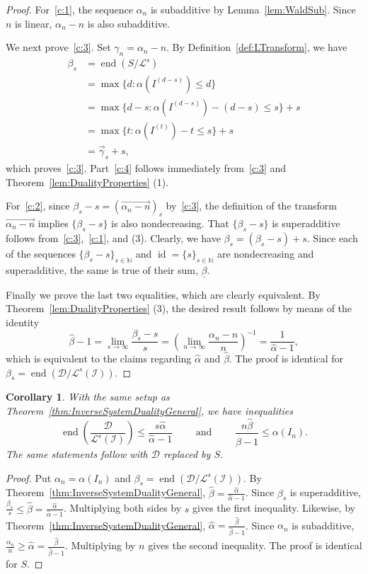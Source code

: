 \documentclass[12pt, reqno]{amsart}
\numberwithin{equation}{section}
\def\a{\ensuremath{\alpha}}
\def\b{\ensuremath{\beta}}
\def\ub{\ensuremath{\underline{\beta}}}
\newcommand{\wa}{\widehat{\alpha}}
\newcommand{\wb}{\widehat{\beta}}
\newcommand{\N}{{\mathbb N}}
\newcommand{\cL}{{\mathcal L}}
\newcommand{\I}{{\mathcal I}}
\renewcommand{\L}{{\mathcal L}}
\DeclareMathOperator{\soc}{end}
\def\id{{\operatorname{id}}}
\theoremstyle{plain} %
\newtheorem{cor}[thm]{Corollary}
\theoremstyle{definition}
\theoremstyle{remark}
\renewcommand{\L}{\mathcal{L}}
\begin{document}
\begin{proof}
For~\eqref{c:1}, the sequence $\alpha_n$ is subadditive by Lemma~\ref{lem:WaldSub}.  Since $n$ is linear, $\alpha_n-n$ is also subadditive.

We next prove~\eqref{c:3}.  Set $\gamma_n=\a_n-n$. By Definition~\ref{def:LTransform}, we have
\[
\begin{array}{rl}
\b_s & =\soc(S/\L^s)\\[5 pt]
&= \max\{d:\alpha(I^{(d-s)})\le d\}\\[5 pt]
&=\max\{d-s:\alpha(I^{(d-s)})-(d-s)\le s\}+s\\[5 pt]
&= \max\{t:\alpha(I^{(t)})-t\le s\}+s\\[5 pt]
&=\overrightarrow{\gamma}_s+s,
\end{array}
\]
which proves~\eqref{c:3}.  Part~\eqref{c:4} follows immediately from~\eqref{c:3} and Theorem~\ref{lem:DualityProperties} (1).

For~\eqref{c:2}, since $\beta_s-s=(\overrightarrow{\a_n-n})_s$ by~\eqref{c:3}, the definition of the transform $\overrightarrow{\a_n-n}$ implies $\{\b_s-s\}$ is also nondecreasing.  That $\{\beta_s-s\}$ is superadditive follows from~\eqref{c:3},~\eqref{c:1}, and  (3). Clearly, we have $\beta_s=(\beta_s-s)+s$. Since each of the sequences $\{\beta_s-s\}_{s\in\N}$ and $\id=\{s\}_{s\in \N}$ are nondecreasing and superadditive, the same is true of their sum, $\ub$.

Finally we prove the last two equalities, which are clearly equivalent.  By Theorem~\ref{lem:DualityProperties} (3), the desired result follows by means of the identity
\[
\wb-1=\lim_{s\to \infty} \frac{\b_s-s}{s}=\left(\lim_{n\to \infty} \frac{\a_n-n}{n}\right)^{-1}=\frac{1}{\wa-1},
\]
which is equivalent to the claims regarding $\wa$ and $\wb$.  The proof is identical for $\beta_s=\soc(\mathcal{D}/\cL^s(\I))$.
\end{proof}

\begin{cor}\label{cor:boundingWaldschmidt}
With the same setup as Theorem~\ref{thm:InverseSystemDualityGeneral}, we have inequalities
\[
\soc\left(\frac{\mathcal{D}}{\L^s(\I)}\right)\le\frac{s\wa}{\wa-1} \qquad  \text{ and }  \qquad 
\frac{n\wb}{\wb-1}\le \alpha(I_n).
\]
The same statements follow with $\mathcal{D}$ replaced by $S$.
\end{cor}
\begin{proof}
Put $\alpha_n=\alpha(I_n)$ and $\beta_s=\soc(\mathcal{D}/\L^s(\I))$.  By Theorem~\ref{thm:InverseSystemDualityGeneral}, $\wb=\frac{\wa}{\wa-1}$.  Since $\beta_s$ is superadditive, $\frac{\beta_s}{s}\le \wb=\frac{\wa}{\wa-1}$.  Multiplying both sides by $s$ gives the first inequality.  Likewise, by Theorem~\ref{thm:InverseSystemDualityGeneral}, $\wa=\frac{\wb}{\wb-1}$.  Since $\alpha_n$ is subadditive, $\frac{\alpha_n}{n}\ge \wa=\frac{\wb}{\wb-1}$.  Multiplying by $n$ gives the second inequality.  The proof is identical for $S$.
\end{proof}
\end{document}
